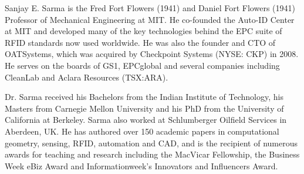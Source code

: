 \documentclass[lettersize,journal]{IEEEtran}
\begin{document}
\vspace{11pt}


\begin{IEEEbiography}{Sanjay E. Sarma} is the Fred Fort Flowers (1941) and Daniel Fort Flowers (1941) Professor of Mechanical Engineering at MIT. He co-founded the Auto-ID Center at MIT and developed many of the key technologies behind the EPC suite of RFID standards now used worldwide. He was also the founder and CTO of OATSystems, which was acquired by Checkpoint Systems (NYSE: CKP) in 2008. He serves on the boards of GS1, EPCglobal and several companies including CleanLab and Aclara Resources (TSX:ARA). 

Dr. Sarma received his Bachelors from the Indian Institute of Technology, his Masters from Carnegie Mellon University and his PhD from the University of California at Berkeley. Sarma also worked at Schlumberger Oilfield Services in Aberdeen, UK. He has authored over 150 academic papers in computational geometry, sensing, RFID, automation and CAD, and is the recipient of numerous awards for teaching and research including the MacVicar Fellowship, the Business Week eBiz Award and Informationweek’s Innovators and Influencers Award.
\end{IEEEbiography}




\vfill
\end{document}
